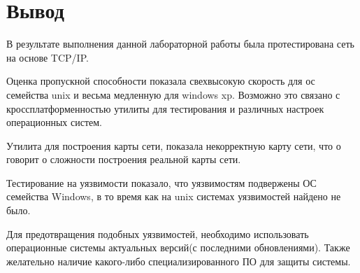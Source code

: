 \documentclass[14pt,a4paper,report]{report}
\begin{document}
\section*{Вывод}
В результате выполнения данной лабораторной работы была протестирована сеть на основе TCP/IP. 

Оценка пропускной способности показала свехвысокую скорость для ос семейства unix и весьма медленную для windows xp. Возможно это связано с кроссплатформенностью утилиты для тестирования и различных настроек операционных систем.

Утилита для построения карты сети, показала некорректную карту сети, что о говорит о сложности построения реальной карты сети.

Тестирование на уязвимости показало, что уязвимостям подвержены ОС семейства Windows, в то время как на unix системах уязвимостей найдено не было.

Для предотвращения подобных уязвимостей, необходимо использовать операционные системы актуальных версий(с последними обновлениями). Также желательно наличие какого-либо специализированного ПО для защиты системы.

%
%
\end{document}
